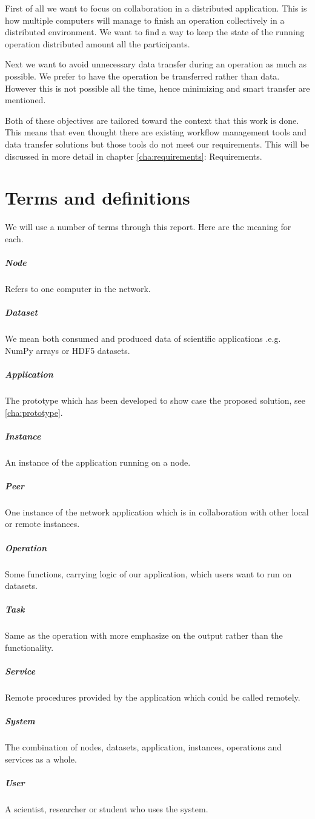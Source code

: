 First of all we want to focus on collaboration in a distributed application.
This is how multiple computers will manage to finish an operation collectively in a distributed environment.
We want to find a way to keep the state of the running operation distributed amount all the participants.

Next we want to avoid unnecessary data transfer during an operation as much as possible.
We prefer to have the operation be transferred rather than data. 
However this is not possible all the time,
hence minimizing and smart transfer are mentioned.

Both of these objectives are tailored toward the context that this work is done. 
This means that even thought there are existing workflow management tools and data transfer solutions 
but those tools do not meet our requirements. 
This will be discussed in more detail in chapter \ref{cha:requirements}: Requirements.




\section{Terms and definitions}
We will use a number of terms through this report. Here are the meaning for each.
\subparagraph{Node}
Refers to one computer in the network.
\subparagraph{Dataset}
We mean both consumed and produced data of scientific applications .e.g. NumPy arrays or HDF5 datasets.
\subparagraph{Application}
The prototype which has been developed to show case the proposed solution, see \ref{cha:prototype}.
\subparagraph{Instance}
An instance of the application running on a node.
\subparagraph{Peer}
One instance of the network application which is in collaboration with other local or remote instances.
\subparagraph{Operation}
Some functions, carrying logic of our application, which users want to run on datasets.
\subparagraph{Task}
Same as the operation with more emphasize on the output rather than the functionality.
\subparagraph{Service}
Remote procedures provided by the application which could be called remotely.
\subparagraph{System}
The combination of nodes, datasets, application, instances, operations and services as a whole.
\subparagraph{User}
A scientist, researcher or student who uses the system.

